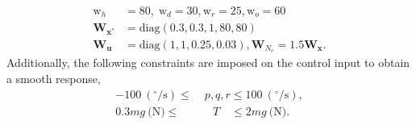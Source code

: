 %
\begin{align*}
    \mathrm{w}_h &= 80, \; \mathrm{w}_d = 30, \mathrm{w}_r = 25, \mathrm{w}_o = 60\\ 
	\mathbf{W}_{\mathbf{x}^{\textrm{*}}} &= \textrm{diag}(0.3,0.3,1,80,80) \\
	\mathbf{W}_{\mathbf{u}} &= \textrm{diag}(1,1,0.25,0.03), \mathbf{W}_{N_c} =1.5\mathbf{W}_{\mathbf{x}}.
\end{align*}
%
Additionally, the following constraints are imposed on the control input to obtain a smooth response,
%
\begin{align} 
    -100\ (^{\circ}/\textrm{s}) \leq & \; p, q, r \leq 100\ (^{\circ}/\textrm{s}), \label{eq:const_rates} \\
    0.3mg\ \text{(N)} \leq & \quad T \quad \leq 2mg\ \text{(N)}. \label{eq:constT}
\end{align}
%

